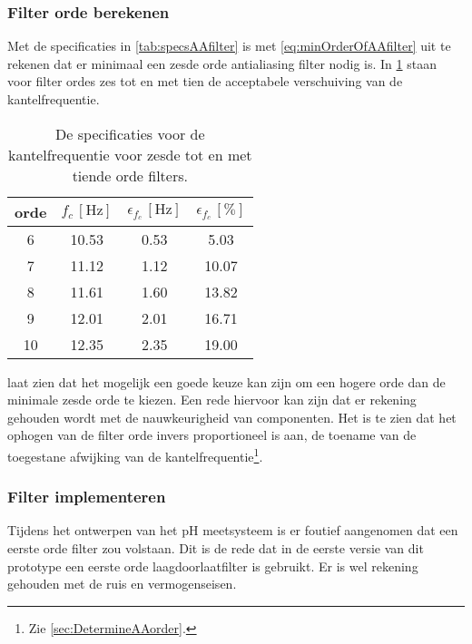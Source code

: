 \subsubsection{Filter orde berekenen}
Met de specificaties in \cref{tab:specsAAfilter} is met \cref{eq:minOrderOfAAfilter} uit te rekenen dat er minimaal een zesde orde antialiasing filter nodig is. In \cref{tab:AA3dBspecs} staan voor filter ordes zes tot en met tien de acceptabele verschuiving van de kantelfrequentie.
\begin{table}[!htbp]
    \centering
    \begin{tabular}{c|c|c|c}
        orde & $f_c\,[\si{\hertz}]$ & $\epsilon_{f_c}\,[\si{\hertz}]$ & $\epsilon_{f_c}\,[\%]$ \\\hline
        6    & 10.53 & 0.53 & 5.03  \\
        7    & 11.12 & 1.12 & 10.07 \\
        8    & 11.61 & 1.60 & 13.82 \\
        9    & 12.01 & 2.01 & 16.71 \\
        10   & 12.35 & 2.35 & 19.00 \\
    \end{tabular}
    \caption{De specificaties voor de kantelfrequentie voor zesde tot en met tiende orde filters.}
    \label{tab:AA3dBspecs}
\end{table}
 laat zien dat het mogelijk een goede keuze kan zijn om een hogere orde dan de minimale zesde orde te kiezen. Een rede hiervoor kan zijn dat er rekening gehouden wordt met de nauwkeurigheid van componenten. Het is te zien dat het ophogen van de filter orde invers proportioneel is aan, de toename van de toegestane afwijking van de kantelfrequentie\footnote{Zie \cref{sec:DetermineAAorder}.}.

\subsubsection{Filter implementeren}
Tijdens het ontwerpen van het pH meetsysteem is er foutief aangenomen dat een eerste orde filter zou volstaan. Dit is de rede dat in de eerste versie van dit prototype een eerste orde laagdoorlaatfilter is gebruikt. Er is wel rekening gehouden met de ruis en vermogenseisen.

